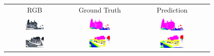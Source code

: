     \begin{figure}[h!]
        \begin{tabular}{ccc}
            RGB & Ground Truth & Prediction \\
            \includegraphics[width=0.33\textwidth, height=0.18\textheight]{images/seg_output/sem3d_seg_output/1_RGB.png} &
            \includegraphics[width=0.33\textwidth, height=0.18\textheight]{images/seg_output/sem3d_seg_output/1_GT.png}& 
            \includegraphics[width=0.33\textwidth, height=0.18\textheight]{images/seg_output/sem3d_seg_output/1_Pred.png}\\

            \includegraphics[width=0.33\textwidth, height=0.18\textheight]{images/seg_output/sem3d_seg_output/2_RGB.png} &
            \includegraphics[width=0.33\textwidth, height=0.18\textheight]{images/seg_output/sem3d_seg_output/2_GT.png}& 
            \includegraphics[width=0.33\textwidth, height=0.18\textheight]{images/seg_output/sem3d_seg_output/2_Pred.png}\\


\end{tabular}
\end{figure}

